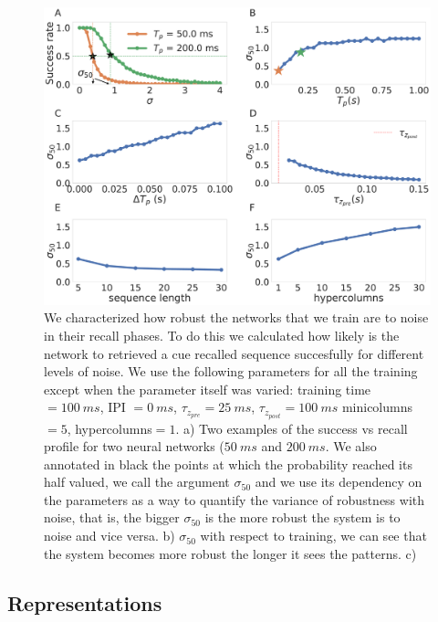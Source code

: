 \documentclass[10pt,a4paper]{article}
\begin{document}
\begin{figure}[H]
\centering
\includegraphics[scale=0.20]{noise_robustness.pdf}
\caption{We characterized  how robust the networks that we train are to noise in their recall phases. To do this we calculated how likely is the network to retrieved a cue recalled sequence succesfully for different levels of noise. We use the following parameters for all the training except when the parameter itself was varied: training time $= 100 \: ms$, IPI $= 0 \: ms$, $\tau_{z_{pre}} = 25 \: ms$, $\tau_{z_{post}} = 100 \: ms$ minicolumns $=5$, hypercolumns$=1$. a) Two examples of the success vs recall profile for two neural networks ($50 \: ms$ and $200 \: ms$. We also annotated in black the points at which the probability reached its half valued, we call the argument $\sigma_{50}$ and we use its dependency on the parameters as a way to quantify the variance of robustness with noise, that is, the bigger $\sigma_{50}$ is the more robust the system is to noise and vice versa. b) $\sigma_{50}$ with respect to training, we can see that the system becomes more robust the longer it sees the patterns. c) }
\label{fig:robustness}
\end{figure}


\subsection{Representations}
\end{document}
